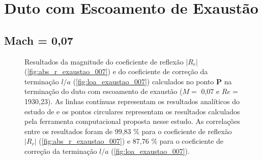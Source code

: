 











\newpage
\section{Duto com Escoamento de Exaustão}

\subsection{Mach = 0,07}

\begin{figure}[ht!]
\begin{subfigure}{\scaleA \textwidth}
  
\end{subfigure}%
\begin{subfigure}{\scaleA \textwidth}
  
\end{subfigure}
\caption[Resultados de $|R_{r}|$ e $l/a$ com escoamento de exaustão ($M =$ 0,07 e $Re =$ 1930,23)]{Resultados da magnitude do coeficiente de reflexão $|R_{r}|$ (\ref{fig:abs_r_exaustao_007}) e do coeficiente de correção da terminação $l/a$ (\ref{fig:loa_exaustao_007}) calculados no ponto $\textbf{P}$ na terminação do duto com escoamento de exaustão ($M =$ 0,07 e $Re =$ 1930,23). As linhas contínuas representam os resultados analíticos do estudo de  e os pontos circulares representam os resultados calculados pela ferramenta computacional proposta nesse estudo. As correlações entre os resultados foram de 99,83 \% para o coeficiente de reflexão $|R_{r}|$ (\ref{fig:abs_r_exaustao_007}) e 87,76 \% para o coeficiente de correção da terminação $l/a$ (\ref{fig:loa_exaustao_007}).}
\label{fig:resultados_exaustao_007}
\end{figure}

\newpage
